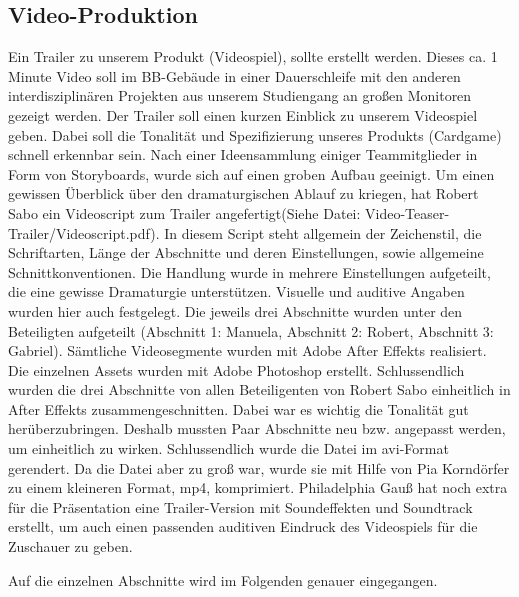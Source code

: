 \subsection{Video-Produktion}
Ein Trailer zu unserem Produkt (Videospiel), sollte erstellt werden. Dieses ca. 1 Minute Video soll im BB-Gebäude in einer Dauerschleife mit den anderen interdisziplinären Projekten aus unserem Studiengang an großen Monitoren gezeigt werden. Der Trailer soll einen kurzen Einblick zu unserem Videospiel geben. Dabei soll die Tonalität und Spezifizierung unseres Produkts (Cardgame) schnell erkennbar sein. Nach einer Ideensammlung einiger Teammitglieder in Form von Storyboards, wurde sich auf einen groben Aufbau geeinigt.
Um einen gewissen Überblick über den dramaturgischen Ablauf zu kriegen, hat Robert Sabo ein Videoscript zum Trailer angefertigt(Siehe Datei: Video-Teaser-Trailer/Videoscript.pdf). In diesem Script steht allgemein der Zeichenstil, die Schriftarten, Länge der Abschnitte und deren Einstellungen, sowie allgemeine Schnittkonventionen. Die Handlung wurde in mehrere Einstellungen aufgeteilt, die eine gewisse Dramaturgie unterstützen. Visuelle und auditive Angaben wurden hier auch festgelegt. Die jeweils drei Abschnitte wurden unter den Beteiligten aufgeteilt (Abschnitt 1: Manuela, Abschnitt 2: Robert, Abschnitt 3: Gabriel). Sämtliche Videosegmente wurden mit Adobe After Effekts realisiert. Die einzelnen Assets wurden mit Adobe Photoshop erstellt. Schlussendlich wurden die drei Abschnitte von allen Beteiligenten von Robert Sabo einheitlich in After Effekts zusammengeschnitten. Dabei war es wichtig die Tonalität gut herüberzubringen. Deshalb mussten Paar Abschnitte neu bzw. angepasst werden, um einheitlich zu wirken. Schlussendlich wurde die Datei im avi-Format gerendert. Da die Datei aber zu groß war, wurde sie mit Hilfe von Pia Korndörfer zu einem kleineren Format, mp4, komprimiert. Philadelphia Gauß hat noch extra für die Präsentation eine Trailer-Version mit Soundeffekten und Soundtrack erstellt, um auch einen passenden auditiven Eindruck des Videospiels für die Zuschauer zu geben.

Auf die einzelnen Abschnitte wird im Folgenden genauer eingegangen.

